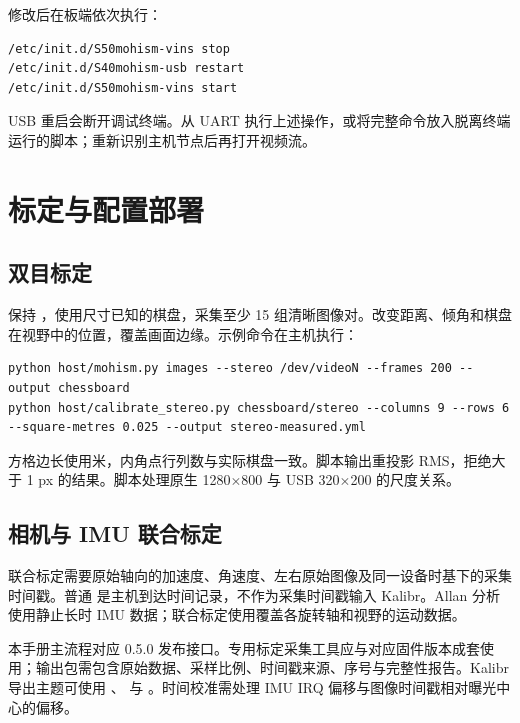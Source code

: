 修改后在板端依次执行：
\begin{lstlisting}
/etc/init.d/S50mohism-vins stop
/etc/init.d/S40mohism-usb restart
/etc/init.d/S50mohism-vins start
\end{lstlisting}
USB 重启会断开调试终端。从 UART 执行上述操作，或将完整命令放入脱离终端运行的脚本；重新识别主机节点后再打开视频流。
\newpage
\section{标定与配置部署}
\subsection{双目标定}
保持 ，使用尺寸已知的棋盘，采集至少 15 组清晰图像对。改变距离、倾角和棋盘在视野中的位置，覆盖画面边缘。示例命令在主机执行：
\begin{lstlisting}
python host/mohism.py images --stereo /dev/videoN --frames 200 --output chessboard
python host/calibrate_stereo.py chessboard/stereo --columns 9 --rows 6 --square-metres 0.025 --output stereo-measured.yml
\end{lstlisting}
方格边长使用米，内角点行列数与实际棋盘一致。脚本输出重投影 RMS，拒绝大于 1 px 的结果。脚本处理原生 1280$\times$800 与 USB 320$\times$200 的尺度关系。

\subsection{相机与 IMU 联合标定}
联合标定需要原始轴向的加速度、角速度、左右原始图像及同一设备时基下的采集时间戳。普通  是主机到达时间记录，不作为采集时间戳输入 Kalibr。Allan 分析使用静止长时 IMU 数据；联合标定使用覆盖各旋转轴和视野的运动数据。

本手册主流程对应 0.5.0 发布接口。专用标定采集工具应与对应固件版本成套使用；输出包需包含原始数据、采样比例、时间戳来源、序号与完整性报告。Kalibr 导出主题可使用 、 与 。时间校准需处理 IMU IRQ 偏移与图像时间戳相对曝光中心的偏移。

